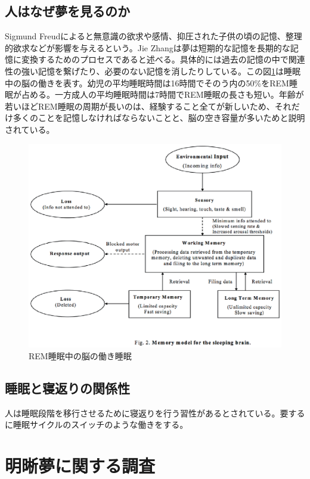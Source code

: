 \subsection{人はなぜ夢を見るのか}
Sigmund Freudによると無意識の欲求や感情、抑圧された子供の頃の記憶、整理的欲求などが影響を与えるという\cite{freud}。Jie Zhangは夢は短期的な記憶を長期的な記憶に変換するためのプロセスであると述べる。具体的には過去の記憶の中で関連性の強い記憶を繋げたり、必要のない記憶を消したりしている\cite{Zhang}。この図\ref{brainZhang}は睡眠中の脳の働きを表す。幼児の平均睡眠時間は16時間でそのう内の50\%をREM睡眠が占める。一方成人の平均睡眠時間は7時間でREM睡眠の長さも短い。年齢が若いほどREM睡眠の周期が長いのは、経験すること全てが新しいため、それだけ多くのことを記憶しなければならないことと、脳の空き容量が多いためと説明されている。

\begin{figure}[htbp]
\begin{center}
\includegraphics[width=15cm]{eps/sleepBrainModel.eps}
\caption{REM睡眠中の脳の働き睡眠}
\label{brainZhang}
\end{center}
\end{figure}

\subsection{睡眠と寝返りの関係性}
人は睡眠段階を移行させるために寝返りを行う習性があるとされている。要するに睡眠サイクルのスイッチのような働きをする。\cite{negaeri}

\section{明晰夢に関する調査}
